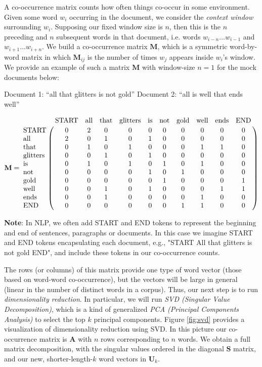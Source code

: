 A co-occurrence matrix counts how often things co-occur in some environment. Given some word $w_i$ occurring in the document, we consider the \textit{context window} surrounding $w_i$. Supposing our fixed window size is $n$, then this is the $n$ preceding and  $n$ subsequent words in that document, i.e. words  $w_{i-n} \dots w_{i-1}$ and $w_{i+1} \dots w_{i+n}$. We build a co-occurrence matrix $\textbf{M}$, which is a symmetric word-by-word matrix in which $\textbf{M}_{ij}$ is the number of times  $w_{j}$ appears inside $w_{i}$'s window. We provide an example of such a matrix $\textbf{M}$ with window-size $n=1$ for the mock documents below:\newline

Document 1: ``all that glitters is not gold''\newline
Document 2: ``all is well that ends well'' \newline

\begin{equation*}
\textbf{M} = \bordermatrix{& \text{START} & \text{all}& \text{that}& \text{glitters}& \text{is} & \text{not} & \text{gold} & \text{well} & \text{ends} & \text{END}\cr
                \text{START} & 0 & 2 & 0 & 0 & 0 & 0 & 0 & 0 & 0 & 0 \cr
                \text{all} & 2 & 0 & 1 & 0 & 1 & 0 & 0 & 0 & 0 & 0 \cr
                \text{that}& 0 & 1 & 0 & 1 & 0 & 0 & 0 & 1 & 1 & 0 \cr
                \text{glitters}& 0 & 0 & 1 & 0 & 1 & 0 & 0 & 0 & 0 & 0 \cr
                \text{is}& 0 & 1 & 0 & 1 & 0 & 1 & 0 & 1 & 0 & 0 \cr
                \text{not}& 0 & 0 & 0 & 0 & 1 & 0 & 1 & 0 & 0 & 0 \cr
                \text{gold}& 0 & 0 & 0 & 0 & 0 & 1 & 0 & 0 & 0 & 1 \cr
                \text{well}& 0 & 0 & 1 & 0 & 1 & 0 & 0 & 0 & 1 & 1\cr
                \text{ends}& 0 & 0 & 1 & 0 & 0 & 0 & 0 & 1 & 0 & 0\cr
                \text{END}& 0 & 0 & 0 & 0 & 0 & 0 & 1 & 1 & 0 & 0\cr
                }
\end{equation*}
\vspace{15pt}

\textbf{Note}: In NLP, we often add START and END tokens to represent the beginning and end of sentences, paragraphs or documents. In this case we imagine START and END tokens encapsulating each document, e.g., "START All that glitters is not gold END", and include these tokens in our co-occurrence counts.\newline

The rows (or columns) of this matrix provide one type of word vector (those based on word-word co-occurrence), but the vectors will be large in general (linear in the number of distinct words in a corpus). Thus, our next step is to run \textit{dimensionality reduction}. In particular, we will run \textit{SVD (Singular Value Decomposition)}, which is a kind of generalized \textit{PCA (Principal Components Analysis)} to select the top  $k$ principal components. Figure \ref{fig:svd} provides a visualization of dimensionality reduction using SVD. In this picture our co-occurrence matrix is $\textbf{A}$ with $n$ rows corresponding to $n$ words. We obtain a full matrix decomposition, with the singular values ordered in the diagonal $\textbf{S}$ matrix, and our new, shorter-length-$k$ word vectors in $\textbf{U}_k$. 

